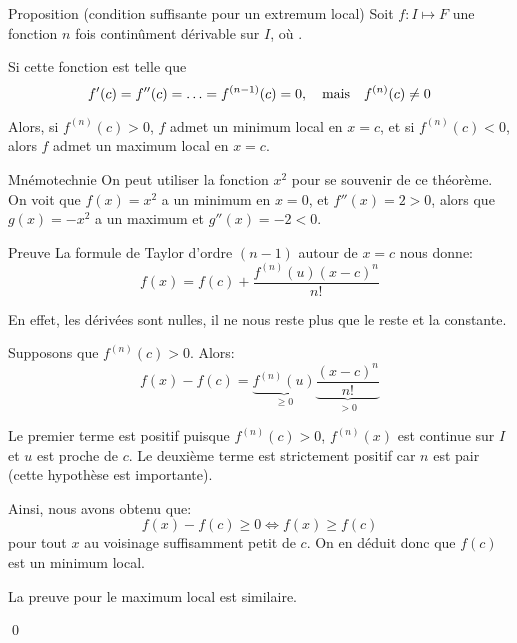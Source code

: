 \documentclass[a4paper]{article}
\begin{document}
\begin{parag}{Proposition (condition suffisante pour un extremum local)}
    Soit $f : I \mapsto F$ une fonction $n$ fois continûment dérivable sur $I$, où .

    Si cette fonction est telle que
    \[f'\left(c\right) = f''\left(c\right) = \ldots = f^{\left(n-1\right)}\left(c\right) = 0, \mathspace \text{mais} \mathspace f^{\left(n\right)}\left(c\right) \neq 0\]

    Alors, si $f^{\left(n\right)}\left(c\right) > 0$, $f$ admet un minimum local en $x = c$, et si $f^{\left(n\right)}\left(c\right) < 0$, alors $f$ admet un maximum local en $x = c$.

    \begin{subparag}{Mnémotechnie}
        On peut utiliser la fonction $x^2$ pour se souvenir de ce théorème. On voit que $f\left(x\right) = x^2$ a un minimum en $x = 0$, et $f''\left(x\right) = 2 > 0$, alors que $g\left(x\right) = -x^2$ a un maximum et $g''\left(x\right) = -2 < 0$.

    \end{subparag}

    \begin{subparag}{Preuve}
        La formule de Taylor d'ordre $\left(n-1\right)$ autour de $x = c$ nous donne:
        \[f\left(x\right) = f\left(c\right) + \frac{f^{\left(n\right)}\left(u\right)\left(x - c\right)^{n}}{n!}\]

        En effet, les dérivées sont nulles, il ne nous reste plus que le reste et la constante.

        Supposons que $f^{\left(n\right)}\left(c\right) > 0$. Alors:
        \[f\left(x\right) - f\left(c\right) = \underbrace{f^{\left(n\right)}\left(u\right)}_{\geq 0} \underbrace{\frac{\left(x - c\right)^{n}}{n!}}_{> 0}\]

        Le premier terme est positif puisque $f^{\left(n\right)}\left(c\right) > 0$, $f^{\left(n\right)}\left(x\right)$ est continue sur $I$ et $u$ est proche de $c$. Le deuxième terme est strictement positif car $n$ est pair (cette hypothèse est importante).

        Ainsi, nous avons obtenu que:
        \[f\left(x\right) - f\left(c\right) \geq 0 \iff f\left(x\right) \geq f\left(c\right)\]
        pour tout $x$ au voisinage suffisamment petit de $c$. On en déduit donc que $f\left(c\right)$ est un minimum local.

        La preuve pour le maximum local est similaire.

        \qed
    \end{subparag}
\end{parag}
\end{document}
